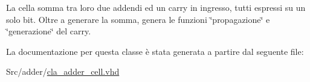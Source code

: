 La cella somma tra loro due addendi ed un carry in ingresso, tutti espressi su un solo bit. Oltre a generare la somma, genera le funzioni \char`\"{}propagazione\char`\"{} e \char`\"{}generazione\char`\"{} del carry. 

La documentazione per questa classe è stata generata a partire dal seguente file\+:\begin{DoxyCompactItemize}
\item 
Src/adder/\hyperlink{cla__adder__cell_8vhd}{cla\+\_\+adder\+\_\+cell.\+vhd}\end{DoxyCompactItemize}
